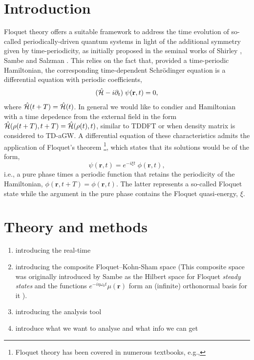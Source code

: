 \documentclass[aps,physrev,preprint,groupedaddress]{revtex4-2}
\newcommand{\fff}[1]{#1}
\renewcommand{\[}{\left[}
\renewcommand{\]}{\right]}
\renewcommand{\(}{\left(}
\renewcommand{\)}{\right)}
\begin{document}
\section{Introduction}
Floquet theory offers a suitable framework to address the time evolution of so-called periodically-driven quantum systems in light of the additional symmetry given by time-periodicity, as initially proposed in the seminal works of Shirley \cite{Shirley1965}, Sambe \cite{Sambe1973} and Salzman \cite{Salzman1973}. This relies on the fact that, provided a time-periodic Hamiltonian, the corresponding time-dependent Schr\"odinger equation is a differential equation with periodic coefficients,
\begin{equation}\label{eq:2-Floquet_1}
    (\hat{\cal H} - i \partial_t)\;\psi(\mathbf{r},t) = 0,
\end{equation}
where $\hat{\cal H}(t+T)=\hat{\cal H}(t)$. In general we would like to condier and Hamiltonian with a time depedence from the external field in the form $\hat{\cal H}(\rho(t+T),t+T)=\hat{\cal H}(\rho(t),t)$, similar to TDDFT or when density matrix is considered to TD-aGW. A differential equation of these characteristics admits the application of Floquet's theorem \cite{Floquet1883}
\footnote{Floquet theory has been covered in numerous textbooks, e.g.,\cite{tannor2007,joachain2011}}, which states that its solutions would be of the form,
\begin{equation}\label{eq:2-Floquet_2}
    \psi(\mathbf{r},t) = e^{-i\xi t}\; \phi(\mathbf{r},t),
\end{equation}
i.e., a pure phase times a periodic function that retains the periodicity of the Hamiltonian, $\phi(\mathbf{r},t+T)=\phi(\mathbf{r},t)$. The latter represents a so-called Floquet state while the argument in the pure phase contains the Floquet quasi-energy, $\xi$. 

\section{\label{sec:theo} Theory and methods}
\begin{enumerate}
    \item introducing the real-time
    \item introducing the composite Floquet--Kohn-Sham space (This composite space was originally introduced by Sambe as the Hilbert space for Floquet \textit{steady states} and the functions $e^{-i\fff{\eta\omega_0} t}\mu(\mathbf{r})$ form an (infinite) orthonormal basis for it \cite{Sambe1973}). 
    \item introducing the analysis tool
    \item introduce what we want to analyse and what info we can get
\end{enumerate}
\end{document}
